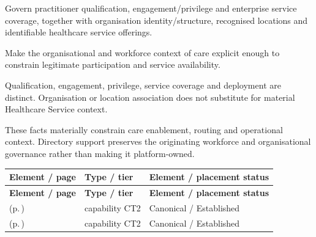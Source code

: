 
Govern practitioner qualification, engagement/\allowbreak{}privilege and enterprise service coverage, together with organisation identity/\allowbreak{}structure, recognised locations and identifiable healthcare service offerings.



Make the organisational and workforce context of care explicit enough to constrain legitimate participation and service availability.



Qualification, engagement, privilege, service coverage and deployment are distinct. Organisation or location association does not substitute for material Healthcare Service context.



These facts materially constrain care enablement, routing and operational context. Directory support preserves the originating workforce and organisational governance rather than making it platform-owned.


\begingroup\small\setlength{\TableWidth}{\dimexpr\linewidth-6\tabcolsep-4\arrayrulewidth\relax}
\begin{longtable}{|>{\raggedright\arraybackslash}p{0.52\TableWidth}|>{\raggedright\arraybackslash}p{0.2\TableWidth}|>{\raggedright\arraybackslash}p{0.28\TableWidth}|}
\hline\rowcolor{TableHead}\textbf{Element / page} & \textbf{Type / tier} & \textbf{Element / placement status}\\\hline\endfirsthead
\hline\rowcolor{TableHead}\textbf{Element / page} & \textbf{Type / tier} & \textbf{Element / placement status}\\\hline\endhead
\hline\endfoot
\nameref{cap:bc-health-workforce-management} (p.\,\pageref{cap:bc-health-workforce-management}) & capability CT2 & Canonical / Established\\\hline
\nameref{cap:bc-healthcare-organisation-service-structure-management} (p.\,\pageref{cap:bc-healthcare-organisation-service-structure-management}) & capability CT2 & Canonical / Established\\\hline
\end{longtable}\endgroup

